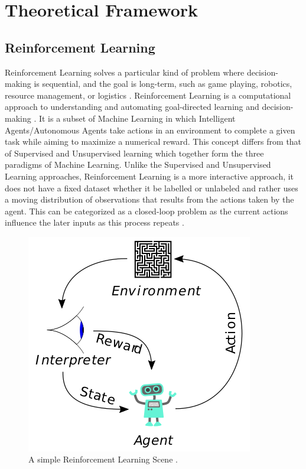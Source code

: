 \section{Theoretical Framework}

\subsection{Reinforcement Learning}

Reinforcement Learning solves a particular kind of problem where decision-making is sequential, and the goal is long-term, such as game playing, robotics, resource management, or logistics \cite{100PML}. Reinforcement Learning is a computational approach to understanding and automating goal-directed learning and decision-making \cite{Sutton1998}. It is a subset of Machine Learning in which Intelligent Agents/Autonomous Agents take actions in an environment to complete a given task while aiming to maximize a numerical reward. This concept differs from that of Supervised and Unsupervised learning which together form the three paradigms of Machine Learning. Unlike the Supervised and Unsupervised Learning approaches, Reinforcement Learning is a more interactive approach, it does not have a fixed dataset whether it be labelled or unlabeled and rather uses a moving distribution of observations that results from the actions taken by the agent. This can be categorized as a closed-loop problem as the current actions influence the later inputs as this process repeats \cite{Sutton1998}. \\

\begin{figure}[h!]
    \centering
    \includegraphics{images/Reinforcement_learning_diagram.svg.png}
    \caption{A simple Reinforcement Learning Scene \cite{wiki}.}
    \label{fig:RLD}
\end{figure}


